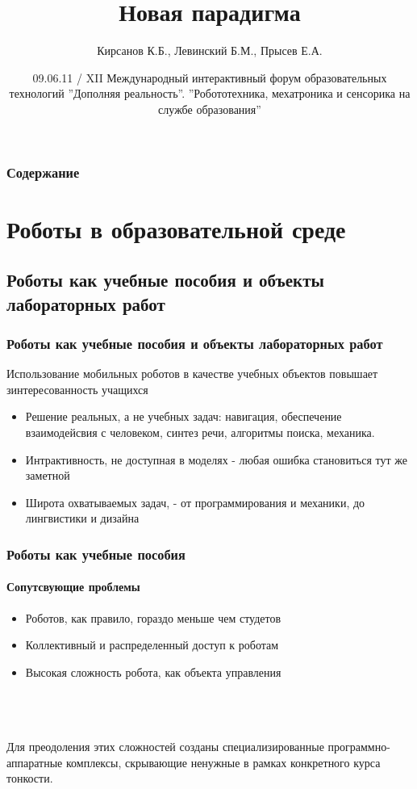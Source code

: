 \documentclass{beamer}
\title{Новая парадигма}
\author{Кирсанов К.Б., Левинский Б.М., Прысев Е.А.}
\institute[sensorika]
{Институт новых образовательных технологий РГГУ.}
\date{09.06.11 / XII Международный интерактивный форум образовательных
технологий ''Дополняя реальность''. ''Робототехника, мехатроника
и сенсорика на службе образования''}
\begin{document}
\begin{frame}
\titlepage
\end{frame}

\begin{frame}
\frametitle{Содержание}
\tableofcontents
\end{frame}

\section{Роботы в образовательной среде}
\subsection{Роботы как учебные пособия и объекты лабораторных работ}
\begin{frame}
\frametitle{Роботы как учебные пособия и объекты лабораторных работ}
Использование мобильных роботов в качестве учебных объектов повышает
зинтересованность учащихся
\\
\begin{itemize}
  \item<1> Решение реальных, а не учебных задач: навигация, обеспечение
  взаимодейсвия с человеком, синтез речи, алгоритмы поиска, механика.
  \item<1> Интрактивность, не доступная в моделях - любая ошибка становиться тут
  же заметной
  \item<1> Широта охватываемых задач, - от программирования и механики, до
  лингвистики и дизайна
\end{itemize}
\end{frame}

\begin{frame}
\frametitle{Роботы как учебные пособия}
\framesubtitle{Сопутсвующие проблемы}
\begin{itemize}
  \item<1> Роботов, как правило, гораздо меньше чем студетов
  \item<1> Коллективный и распределенный доступ к роботам
  \item<1> Высокая сложность робота, как объекта управления
\end{itemize}

\\ \\ \\
Для преодоления этих сложностей созданы специализированные
программно-аппаратные комплексы, скрывающие ненужные в рамках
конкретного курса тонкости.

\end{frame}
\end{document}
